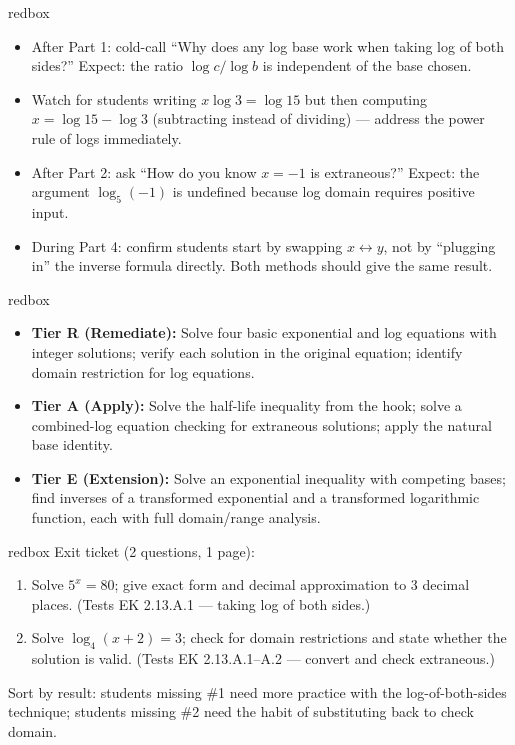\documentclass[10pt]{article}
\begin{document}
\begin{skillbox}{redbox}
\begin{itemize}[leftmargin=1.2em,itemsep=2pt,topsep=0pt]
  \item After Part 1: cold-call ``Why does any log base work when taking log of both sides?''
        Expect: the ratio $\log c/\log b$ is independent of the base chosen.
  \item Watch for students writing $x\log 3 = \log 15$ but then computing $x = \log 15 - \log 3$
        (subtracting instead of dividing) --- address the power rule of logs immediately.
  \item After Part 2: ask ``How do you know $x=-1$ is extraneous?'' Expect: the argument
        $\log_5(-1)$ is undefined because log domain requires positive input.
  \item During Part 4: confirm students start by swapping $x \leftrightarrow y$, not by
        ``plugging in'' the inverse formula directly. Both methods should give the same result.
\end{itemize}
\end{skillbox}

\begin{skillbox}{redbox}
\begin{itemize}[leftmargin=1.2em,itemsep=2pt,topsep=0pt]
  \item \textbf{Tier R (Remediate):} Solve four basic exponential and log equations with
        integer solutions; verify each solution in the original equation; identify domain
        restriction for log equations.
  \item \textbf{Tier A (Apply):} Solve the half-life inequality from the hook; solve a
        combined-log equation checking for extraneous solutions; apply the natural base
        identity.
  \item \textbf{Tier E (Extension):} Solve an exponential inequality with competing bases;
        find inverses of a transformed exponential and a transformed logarithmic function,
        each with full domain/range analysis.
\end{itemize}
\end{skillbox}

\begin{skillbox}{redbox}
Exit ticket (2 questions, 1 page):
\begin{enumerate}[leftmargin=1.5em,itemsep=2pt,topsep=2pt]
  \item Solve $5^x = 80$; give exact form and decimal approximation to 3 decimal places.
        (Tests EK 2.13.A.1 --- taking log of both sides.)
  \item Solve $\log_4(x+2)=3$; check for domain restrictions and state whether the
        solution is valid. (Tests EK 2.13.A.1--A.2 --- convert and check extraneous.)
\end{enumerate}

Sort by result: students missing \#1 need more practice with the log-of-both-sides
technique; students missing \#2 need the habit of substituting back to check domain.
\end{skillbox}
\end{document}
